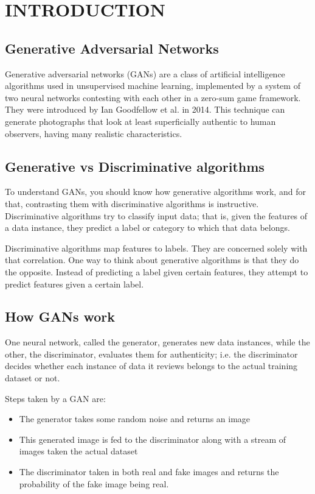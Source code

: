 \chapter{INTRODUCTION}
    \section{Generative Adversarial Networks}
    Generative adversarial networks (GANs) are a class of artificial intelligence 
    algorithms used in unsupervised machine learning, implemented by a system of 
    two neural networks contesting with each other in a zero-sum game framework. 
    They were introduced by Ian Goodfellow et al. in 2014\cite{base}. This technique 
    can generate photographs that look at least superficially authentic to human 
    observers, having many realistic characteristics.\cite{improvedtechniques}

    \section{Generative vs Discriminative algorithms}
    To understand GANs, you should know how generative algorithms work, and for 
    that, contrasting them with discriminative algorithms is instructive. 
    Discriminative algorithms try to classify input data; that is, given the 
    features of a data instance, they predict a label or category to which that 
    data belongs.


    Discriminative algorithms map features to labels. They are concerned solely 
    with that correlation. One way to think about generative algorithms is that 
    they do the opposite. Instead of predicting a label given certain features, 
    they attempt to predict features given a certain label.

    \section{How GANs work}

    One neural network, called the generator, generates new data instances, while 
    the other, the discriminator, evaluates them for authenticity; i.e. the 
    discriminator decides whether each instance of data it reviews belongs to the 
    actual training dataset or not.\cite{fourj}

    Steps taken by a GAN are:
    \begin{itemize}
    \item{The generator takes some random noise and returns an image}
    \item{This generated image is fed to the discriminator along with a stream of 
    images taken the actual dataset}
    \item{The discriminator taken in both real and fake images and returns the 
    probability of the fake image being real.}
\end{itemize}